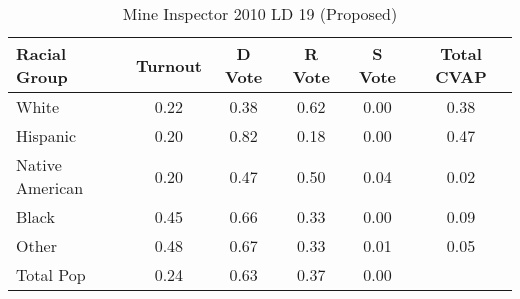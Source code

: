 \begin{table}[htb]
\begin{center}
\caption{Mine Inspector 2010 LD 19 (Proposed)}
\label{smine_cvap_ld_19}
\begin{tabular}{lccccc}
  \hline
Racial Group & Turnout & D Vote & R Vote & S Vote & Total CVAP \\ 
  \hline
White & 0.22 & 0.38 & 0.62 & 0.00 & 0.38 \\ 
  Hispanic & 0.20 & 0.82 & 0.18 & 0.00 & 0.47 \\ 
  Native American & 0.20 & 0.47 & 0.50 & 0.04 & 0.02 \\ 
  Black & 0.45 & 0.66 & 0.33 & 0.00 & 0.09 \\ 
  Other & 0.48 & 0.67 & 0.33 & 0.01 & 0.05 \\ 
  Total Pop & 0.24 & 0.63 & 0.37 & 0.00 &  \\ 
   \hline
\end{tabular}
\end{center}
\end{table}
